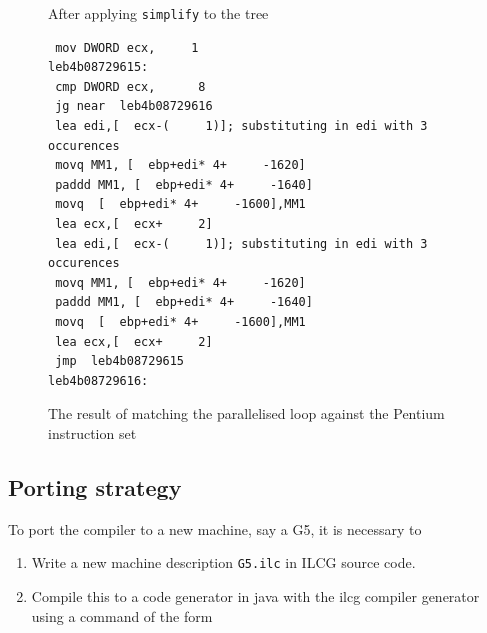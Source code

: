 {{\begin{figure}
\caption{After applying \texttt{simplify} to the tree}

\label{simpf}
\end{figure}


%
\begin{figure}
\begin{verbatim}
 mov DWORD ecx,     1
leb4b08729615: 
 cmp DWORD ecx,      8
 jg near  leb4b08729616
 lea edi,[  ecx-(     1)]; substituting in edi with 3 occurences  
 movq MM1, [  ebp+edi* 4+     -1620]
 paddd MM1, [  ebp+edi* 4+     -1640]
 movq  [  ebp+edi* 4+     -1600],MM1
 lea ecx,[  ecx+     2]
 lea edi,[  ecx-(     1)]; substituting in edi with 3 occurences  
 movq MM1, [  ebp+edi* 4+     -1620]
 paddd MM1, [  ebp+edi* 4+     -1640]
 movq  [  ebp+edi* 4+     -1600],MM1
 lea ecx,[  ecx+     2]
 jmp  leb4b08729615
leb4b08729616:
\end{verbatim}


\caption{The result of matching the parallelised loop against the Pentium
instruction set}

\label{matchf}
\end{figure}



\subsection{Porting strategy}

To port the compiler to a new machine, say a G5, it is necessary to

\begin{enumerate}
\item Write a new machine description \texttt{G5.ilc} in ILCG source code. 
\item Compile this to a code generator in java with the ilcg compiler generator
using a command of the form


\end{enumerate}}}
